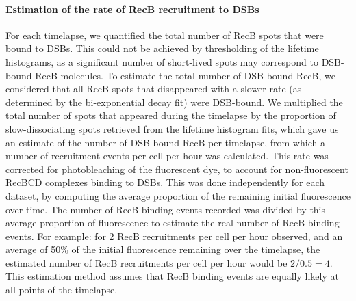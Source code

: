 \paragraph*{Estimation of the rate of RecB recruitment to DSBs}
For each timelapse, we quantified the total number of RecB spots that were bound to DSBs. This could not be achieved by thresholding of the lifetime histograms, as a significant number of short-lived spots may correspond to DSB-bound RecB molecules. To estimate the total number of DSB-bound RecB, we considered that all RecB spots that disappeared with a slower rate (as determined by the bi-exponential decay fit) were DSB-bound. We multiplied the total number of spots that appeared during the timelapse by the proportion of slow-dissociating spots retrieved from the lifetime histogram fits, which gave us an estimate of the number of DSB-bound RecB per timelapse, from which a number of recruitment events per cell per hour was calculated. This rate was corrected for photobleaching of the fluorescent dye, to account for non-fluorescent RecBCD complexes binding to DSBs. This was done independently for each dataset, by computing the average proportion of the remaining initial fluorescence over time. The number of RecB binding events recorded was divided by this average proportion of fluorescence to estimate the real number of RecB binding events. For example: for 2 RecB recruitments per cell per hour observed, and an average of 50\% of the initial fluorescence remaining over the timelapse, the estimated number of RecB recruitments per cell per hour would be $2/0.5 = 4$. This estimation method assumes that RecB binding events are equally likely at all points of the timelapse.

